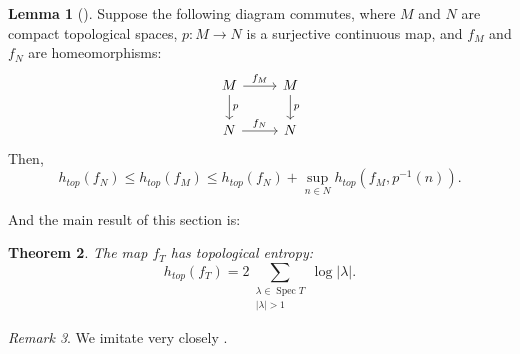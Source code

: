 \documentclass{amsart}
\theoremstyle{theorem}
\newtheorem{theorem}{Theorem}[section]
\theoremstyle{definition}
\theoremstyle{definition}
\theoremstyle{definition}
\theoremstyle{theorem}
\newtheorem{lemma}[theorem]{Lemma}
\theoremstyle{theorem}
\theoremstyle{theorem}
\theoremstyle{corollary}
\theoremstyle{question}
\theoremstyle{remark}
\newtheorem{remark}[theorem]{Remark}
\begin{document}
\begin{lemma}[{\cite[Propositions 3.2, 3.5]{FL}}]\label{quotients}
    Suppose the following diagram commutes, where $M$ and $N$ are compact topological spaces, $p:M\to N$ is a surjective continuous map, and $f_M$ and $f_N$ are homeomorphisms: \[\begin{tikzcd}
	M & M \\
	N & N
	\arrow["{f_M}", from=1-1, to=1-2]
	\arrow["p", from=1-1, to=2-1]
	\arrow["p", from=1-2, to=2-2]
	\arrow["{f_N}", from=2-1, to=2-2]
    \end{tikzcd}\]
    Then, $$h_{top}(f_N)\leq h_{top}(f_M)\leq h_{top}(f_N)+\sup_{n\in N}h_{top}(f_M, p^{-1}(n)).$$
\end{lemma}

And the main result of this section is:

\begin{theorem}
    The map $f_T$ has topological entropy: $$h_{top}(f_T)=2\sum_{\substack{\lambda\in\operatorname{Spec}T \\ {|\lambda|>1}}}\log |\lambda|.$$
\end{theorem}

\begin{remark}
    We imitate very closely \cite[Section 3.2]{FL}.
\end{remark}
\end{document}
